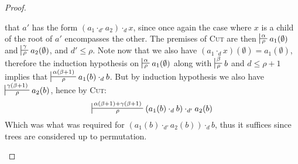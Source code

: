 \documentclass{article}
\begin{document}
\begin{proof}
\begin{itemize}
that $a'$ has the form $(a_1 \cdot_{d'} a_2) \cdot_d x$, since once again the case where $x$ is a child of the root of $a'$ encompasses the other. The premises of \textsc{Cut} are then
$\sststile{\rho}{\alpha} a_1(\emptyset)$ and $\sststile{\rho}{\gamma} a_2(\emptyset)$, and $d'\leq \rho$. Note now that we also have $(a_1 \cdot_d x)(\emptyset) = a_1(\emptyset)$, therefore
the induction hypothesis on $\sststile{\rho}{\alpha} a_1(\emptyset)$ along with $\sststile{\rho}{\beta} b$ and $d\leq \rho+1$ implies that
$\sststile{\rho}{\alpha(\beta+1)} a_1(b) \cdot_d b$. But by induction hypothesis we also have $\sststile{\rho}{\gamma(\beta+1) }a_2(b)$, hence by \textsc{Cut}:
\[
\sststile{\rho}{\alpha(\beta+1) + \gamma(\beta+1)} (a_1(b) \cdot_d b) \cdot_{d'} a_2(b)
\]
Which was what was required for $(a_1(b) \cdot_{d'} a_2(b)) \cdot_d b$, thus it suffices since trees are considered up to permutation.
\end{itemize}
\end{proof}
\end{document}
